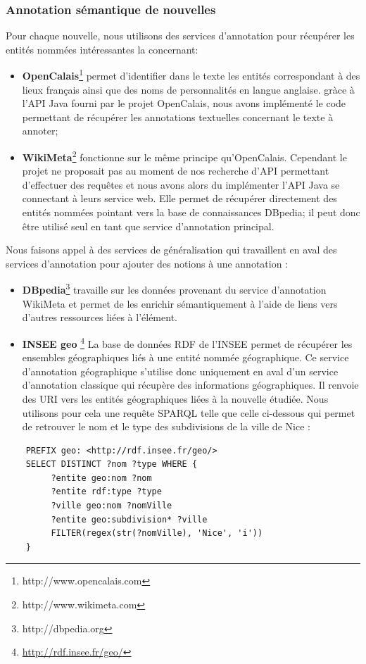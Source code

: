 \documentclass[]{easychair}
\begin{document}
\subsubsection{Annotation sémantique de nouvelles}
Pour chaque nouvelle, nous utilisons des services d'annotation pour récupérer les entités nommées intéressantes la concernant: 
\begin{itemize}
	\item \textbf{OpenCalais}\footnote{http://www.opencalais.com} permet d'identifier dans le texte les entités correspondant à des lieux français ainsi que des noms de personnalités en langue anglaise. gràce à l'API Java fourni par le projet OpenCalais, nous avons implémenté le code permettant de récupérer les annotations textuelles concernant le texte à annoter;
  \item \textbf{WikiMeta}\footnote{http://www.wikimeta.com} fonctionne sur le même principe qu'OpenCalais. Cependant le projet ne proposait pas au moment de nos recherche d'API permettant d'effectuer des requêtes et nous avons alors du implémenter l'API Java se connectant à leurs service web. Elle permet de récupérer directement des entités nommées pointant vers la base de connaissances DBpedia; il peut donc être utilisé seul en tant que service d'annotation principal.
\end{itemize}

Nous faisons appel à des services de généralisation qui travaillent en aval des services d'annotation pour ajouter des notions à une annotation :
\begin{itemize}
	\item \textbf{DBpedia}\footnote{http://dbpedia.org} travaille sur les données provenant du service d'annotation WikiMeta et permet de les enrichir sémantiquement à l'aide de liens vers d'autres ressources liées à l'élément.
  \item \textbf{INSEE geo} \footnote{\url{http://rdf.insee.fr/geo/}} La base de données RDF de l'INSEE permet de récupérer les ensembles géographiques liés à une entité nommée géographique. Ce service d'annotation géographique s'utilise donc uniquement en aval d'un service d'annotation classique qui récupère des informations géographiques. Il renvoie des URI vers les entités géographiques liées à la nouvelle étudiée. Nous utilisons pour cela une requête SPARQL telle que celle ci-dessous qui permet de retrouver le nom et le type des subdivisions de la ville de Nice :
\end{itemize}

\begin{verbatim}
    PREFIX geo: <http://rdf.insee.fr/geo/>
    SELECT DISTINCT ?nom ?type WHERE {
	     ?entite geo:nom ?nom
	     ?entite rdf:type ?type
	     ?ville geo:nom ?nomVille
         ?entite geo:subdivision* ?ville
         FILTER(regex(str(?nomVille), 'Nice', 'i'))
    }
\end{verbatim}
\end{document}
